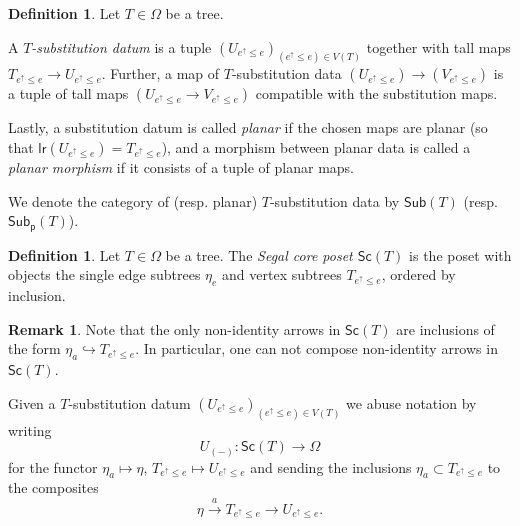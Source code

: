 \documentclass[a4paper,10pt
,draft
]{article}%
\numberwithin{equation}{section}
\numberwithin{figure}{section}
\theoremstyle{definition} %
\newtheorem{definition}[equation]{Definition}%
\newtheorem{remark}[equation]{Remark}%
\newcommand{\1}{\ensuremath{\mathbbm 1}}%
\begin{document}
\begin{definition}\label{SUBSTITUTIONDATUM}
	Let $T \in \Omega$ be a tree.
	
	A \textit{$T$-substitution datum} is a tuple 
	$\left(U_{e^{\uparrow} \leq e}\right)_{(e^{\uparrow} \leq e)\in V(T)}$ together with tall maps
	$T_{e^{\uparrow}\leq e} \to U_{e^{\uparrow}\leq e}$.
	Further, a map of $T$-substitution data 
	$\left(U_{e^{\uparrow} \leq e}\right) \to \left(V_{e^{\uparrow} \leq e}\right)$ is a tuple of tall maps $\left(U_{e^{\uparrow} \leq e}\to V_{e^{\uparrow} \leq e}\right)$ compatible with the substitution maps.
	
	Lastly, a substitution datum is called \textit{planar}
        if the chosen maps are planar (so that 
	$\mathsf{lr}(U_{e^{\uparrow} \leq e}) = T_{e^{\uparrow} \leq e}$),
        and a morphism between planar data is called a \textit{planar morphism} if it consists of a tuple of planar maps.
	
	We denote the category of (resp. planar) $T$-substitution data 
	by $\mathsf{Sub}(T)$ (resp. $\mathsf{Sub}_{\mathsf{p}}(T)$).
\end{definition}

\begin{definition}
	Let $T \in \Omega$ be a tree. 
	The \textit{Segal core poset $\mathsf{Sc}(T)$} is the poset with objects the single edge subtrees $\eta_e$ and vertex subtrees $T_{e^{\uparrow} \leq e}$, ordered by inclusion.
\end{definition}


\begin{remark}\label{SCTARR REM}
Note that the only non-identity arrows in $\mathsf{Sc}(T)$ are inclusions of the form $\eta_a \hookrightarrow T_{e^{\uparrow}\leq e}$.
In particular, one can not compose non-identity arrows in $\mathsf{Sc}(T)$.
\end{remark}

Given a $T$-substitution datum 
$\left(U_{e^{\uparrow} \leq e}\right)_{(e^{\uparrow} \leq e)\in V(T)}$
we abuse notation by writing
\[U_{(\minus)} \colon \mathsf{Sc}(T) \to \Omega\]
for the functor $\eta_a \mapsto \eta$, $T_{e^{\uparrow} \leq e} \mapsto U_{e^{\uparrow} \leq e}$  
and sending the inclusions $\eta_a \subset T_{e^{\uparrow} \leq e}$
to the composites
\[
\eta \xrightarrow{a} T_{e^{\uparrow} \leq e}  \to 
U_{e^{\uparrow} \leq e}.\]
\end{document}

